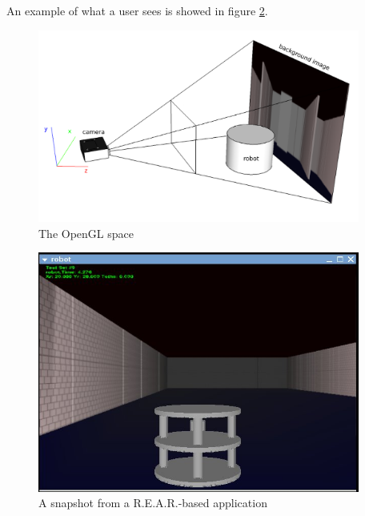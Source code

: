 %
An example of what a user sees is showed in figure \ref{fig:snap}.
%
\begin{figure}[!h]
  \begin{center}
    \includegraphics[width=300pt]{img/camera_frustum_scheme.png}
    \caption{The OpenGL space}
    \label{fig:openglspace}
  \end{center}
\end{figure}
%
\begin{figure}[!h]
  \begin{center}
    \includegraphics[width=300pt]{img/rear_snapshot_large.jpg}
    \caption{A snapshot from a \textsf{R.E.A.R.}-based application}
    \label{fig:snap}
  \end{center}
\end{figure}
%

